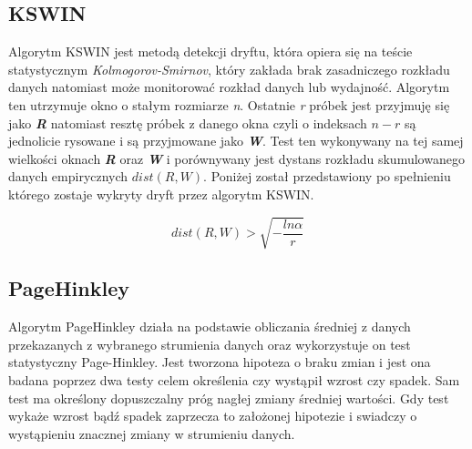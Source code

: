 \documentclass{classrep}
\begin{document}
{        \subsection{KSWIN} {
            Algorytm KSWIN\cite{kswin} jest metodą detekcji dryftu, która opiera się na
            teście statystycznym \emph{Kolmogorov-Smirnov}, który zakłada brak
            zasadniczego rozkładu danych natomiast może monitorować rozkład danych lub
            wydajność. Algorytm ten utrzymuje okno o stałym rozmiarze \emph{n}.
            Ostatnie \emph{r} próbek jest przyjmuję się jako \emph{\textbf{R}}
            natomiast resztę próbek z danego okna czyli o indeksach $n-r$ są jednolicie
            rysowane i są przyjmowane jako \emph{\textbf{W}}. Test ten wykonywany na
            tej samej wielkości oknach \emph{\textbf{R}} oraz \emph{\textbf{W}} i
            porównywany jest dystans rozkładu skumulowanego danych empirycznych
            $dist(R,W)$. Poniżej został przedstawiony po spełnieniu którego zostaje
            wykryty dryft przez algorytm KSWIN.

            $$
            dist(R,W) > \sqrt{-\frac{ln\alpha} {r}}
            $$
        }

        \subsection{PageHinkley} {
            Algorytm PageHinkley\cite{page_hinkley} działa na podstawie obliczania
            średniej z danych przekazanych z wybranego strumienia danych oraz wykorzystuje
            on test statystyczny Page-Hinkley\cite{page_hinkley_test}. Jest tworzona
            hipoteza o braku zmian i jest ona badana poprzez dwa testy celem określenia
            czy wystąpił wzrost czy spadek. Sam test ma określony dopuszczalny próg
            nagłej zmiany średniej wartości. Gdy test wykaże wzrost bądź spadek
            zaprzecza to założonej hipotezie i swiadczy o wystąpieniu znacznej zmiany w
            strumieniu danych.
        }

    }
\end{document}
